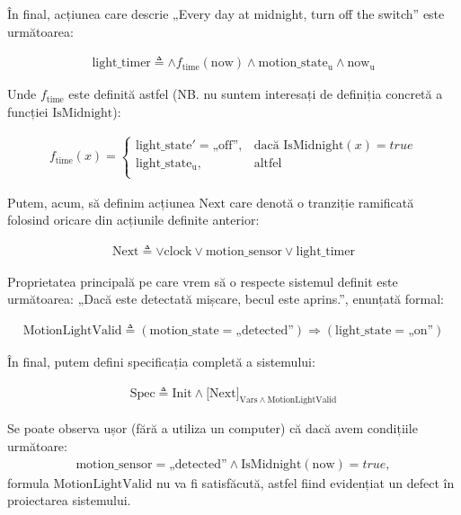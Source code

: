 În final, acțiunea care descrie „Every day at midnight, turn off the switch” este următoarea:

\begin{align*}
    \mathrm{light\_timer} \triangleq \wedge f_{\mathrm{time}}(\mathrm{now}) \wedge \mathrm{motion\_state_u} \wedge \mathrm{now_u}
\end{align*}

Unde $f_{\mathrm{time}}$ este definită astfel (NB. nu suntem interesați de definiția concretă a funcției $\mathrm{IsMidnight}$):

\begin{align*}
    f_{\mathrm{time}}(x) = \left\{
        \begin{array}{ll}
              \mathrm{light\_state'} = \text{„off”}, & \text{dacă } \mathrm{IsMidnight}(x) = true \\
              \mathrm{light\_state_u}, & \text{altfel} \\
        \end{array} 
        \right. 
\end{align*}

Putem, acum, să definim acțiunea $\mathrm{Next}$ care denotă o tranziție ramificată folosind oricare din acțiunile definite anterior:

\begin{align*}
    \mathrm{Next} \triangleq \vee \mathrm{clock} \vee \mathrm{motion\_sensor} \vee \mathrm{light\_timer}
\end{align*}

Proprietatea principală pe care vrem să o respecte sistemul definit este următoarea: „Dacă este detectată mișcare, becul este aprins.”, enunțată formal:

\begin{align*}
    \mathrm{MotionLightValid} \triangleq (\mathrm{motion\_state} = \text{„detected”}) \Rightarrow (\mathrm{light\_state} = \text{„on”})
\end{align*}

În final, putem defini specificația completă a sistemului:

\begin{align*}
    \mathrm{Spec} \triangleq \mathrm{Init} \wedge {[}\mathrm{Next}{]}_{\mathrm{Vars} \wedge \mathrm{MotionLightValid}}
\end{align*}

Se poate observa ușor (fără a utiliza un computer) că dacă avem condițiile următoare:
\begin{gather*}
    \mathrm{motion\_sensor} = \text{„detected”} \wedge \mathrm{IsMidnight}(\mathrm{now}) = true,
\end{gather*}
formula $\mathrm{MotionLightValid}$ nu va fi satisfăcută, astfel fiind evidențiat un defect în proiectarea sistemului.

